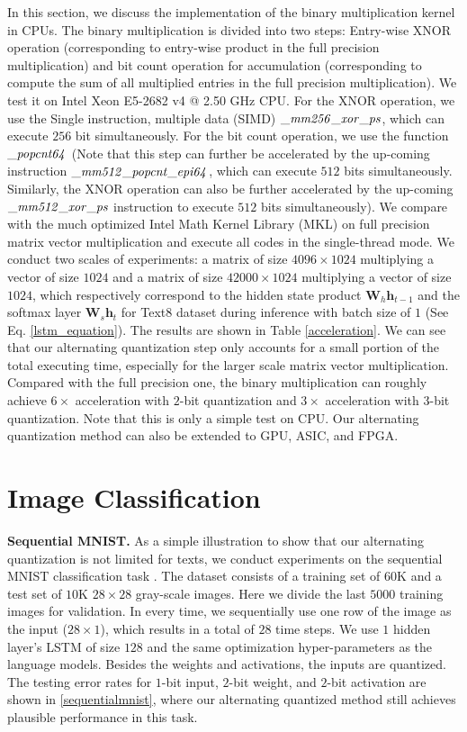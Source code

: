 \documentclass{article} %
\newcommand{\<}{\left\langle}
\renewcommand{\>}{\right\rangle}
\begin{document}
In this section, we discuss the implementation of the binary multiplication kernel in CPUs. The binary multiplication is divided into two steps: Entry-wise XNOR operation (corresponding to entry-wise product in the full precision multiplication) and bit count operation for accumulation (corresponding to compute the sum of all multiplied entries in the full precision multiplication). We test it on Intel Xeon E5-2682 v4 @ 2.50 GHz CPU. For the XNOR operation, we use the Single instruction, multiple data (SIMD) $\it{\_mm256\_xor\_ps}$, which can execute $256$ bit simultaneously. For the bit count operation, we use the function $\it{\_popcnt64}$ (Note that this step can further be accelerated by the up-coming instruction $\it{\_mm512\_popcnt\_epi64}$, which can execute $512$ bits simultaneously. Similarly, the XNOR operation can also be further accelerated by the up-coming $\it{\_mm512\_xor\_ps}$ instruction to execute $512$ bits simultaneously). We compare with the much optimized Intel Math Kernel Library (MKL) on full precision matrix vector multiplication and execute all codes in the single-thread mode. We conduct two scales of experiments: a matrix of size $4096 \times 1024$ multiplying a vector of size $1024$ and a matrix of size $42000 \times 1024$ multiplying a vector of size $1024$, which respectively correspond to the hidden state product $\mathbf{W}_h \mathbf{h}_{t-1}$ and the softmax layer $\mathbf{W}_s \mathbf{h}_t$ for Text8 dataset during inference with batch size of $1$ (See Eq. \eqref{lstm_equation}). The results are shown in Table \ref{acceleration}. We can see that our alternating quantization step only accounts for a small portion of the total executing time, especially for the larger scale matrix vector multiplication. Compared with the full precision one, the binary multiplication can roughly achieve $6\times$ acceleration with $2$-bit quantization and   $3\times$ acceleration with $3$-bit quantization. Note that this is only a simple test on CPU. Our alternating quantization method can also be extended to GPU, ASIC, and FPGA.

\section{Image Classification}\label{imageclassification}

\textbf{Sequential MNIST.} As a simple illustration to show that our alternating quantization is not limited for texts, we conduct experiments on the sequential MNIST classification task \citep{bnrnn}. The dataset consists of a training set of $60$K and a test set of $10$K $28 \times 28$ gray-scale images. Here  we divide the last $5000$ training images for validation. In every time, we sequentially use one row of the image as the input ($28 \times 1$), which results in a total of $28$ time steps. We use $1$ hidden layer’s LSTM of size $128$ and the same optimization hyper-parameters as the language models. Besides the weights and activations, the inputs are quantized. The testing error rates for $1$-bit input, $2$-bit weight, and $2$-bit activation are shown in \ref{sequentialmnist}, where our alternating quantized method still achieves plausible performance in this task. 
\end{document}
